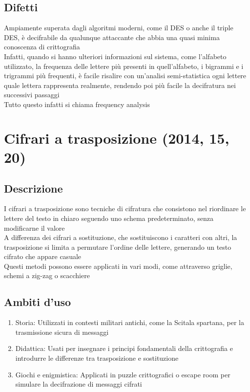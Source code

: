 \documentclass[10pt,oneside,a4paper]{article}
\begin{document}
\subsection{Difetti}
Ampiamente superata dagli algoritmi moderni, come il DES o anche il triple DES, è decifrabile da qualunque attaccante che abbia una quasi minima conoscenza di crittografia\\
Infatti, quando si hanno ulteriori informazioni sul sistema, come l'alfabeto utilizzato, la frequenza delle lettere più presenti in quell'alfabeto, i bigrammi e i trigrammi più frequenti, è facile risalire con un'analisi semi-statistica ogni lettere quale lettera rappresenta realmente, rendendo poi più facile la decifratura nei successivi passaggi\\
Tutto questo infatti si chiama frequency analysis
\section{Cifrari a trasposizione (2014, 15, 20)}
\subsection{Descrizione}
I cifrari a trasposizione sono tecniche di cifratura che consistono nel riordinare le lettere del testo in chiaro seguendo uno schema predeterminato, senza modificarne il valore\\
A differenza dei cifrari a sostituzione, che sostituiscono i caratteri con altri, la trasposizione si limita a permutare l'ordine delle lettere, generando un testo cifrato che appare casuale\\
Questi metodi possono essere applicati in vari modi, come attraverso griglie, schemi a zig-zag o scacchiere
\subsection{Ambiti d'uso}
\begin{enumerate}
\item Storia: Utilizzati in contesti militari antichi, come la Scitala spartana, per la trasmissione sicura di messaggi
\item Didattica: Usati per insegnare i principi fondamentali della crittografia e introdurre le differenze tra trasposizione e sostituzione
\item Giochi e enigmistica: Applicati in puzzle crittografici o escape room per simulare la decifrazione di messaggi cifrati
\end{enumerate}
\end{document}
